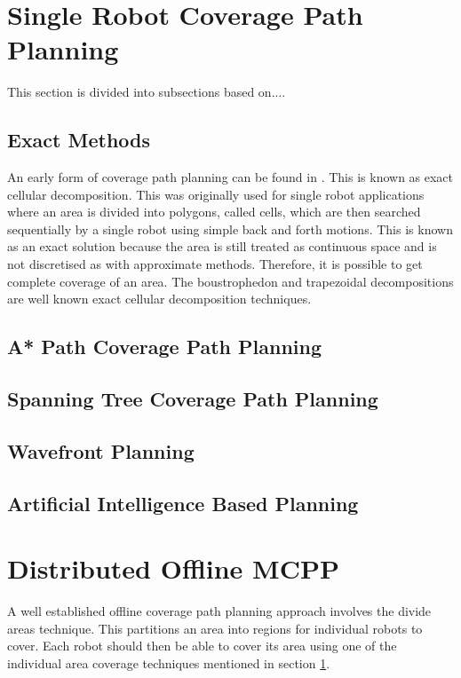 \section{Single Robot Coverage Path Planning}
\label{sec:lit SR CPP}
This section is divided into subsections based on....
\subsection{Exact Methods}
\label{sec:lit SR CPP - Exact}
An early form of coverage path planning can be found in \cite{Choset2001}. This is known as exact cellular decomposition. This was originally used for single robot applications where an area is divided into polygons, called cells, which are then searched sequentially by a single robot using simple back and forth motions. This is known as an exact solution because the area is still treated as continuous space and is not discretised as with approximate methods. Therefore, it is possible to get complete coverage of an area. The boustrophedon and trapezoidal decompositions are well known exact cellular decomposition techniques.\\
\subsection{A* Path Coverage Path Planning}
\subsection{Spanning Tree Coverage Path Planning}
\label{sec:lit SR CPP - STC}

\subsection{Wavefront Planning}
\subsection{Artificial Intelligence Based Planning}

\section{Distributed Offline MCPP}
\label{sec:lit Ditributed MCPP}
A well established offline coverage path planning approach involves the divide areas technique. This partitions an area into regions for individual robots to cover. Each robot should then be able to cover its area using one of the individual area coverage techniques mentioned in section \ref{sec:lit SR CPP}.

